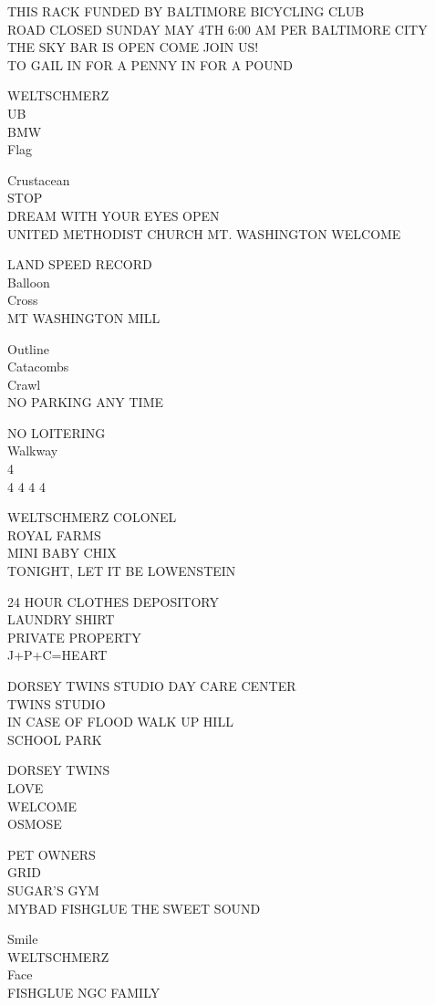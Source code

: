 \documentclass[10pt,letterpaper]{article}
\begin{document}
THIS RACK FUNDED BY BALTIMORE BICYCLING CLUB\\
ROAD CLOSED SUNDAY MAY 4TH 6:00 AM PER BALTIMORE CITY\\
THE SKY BAR IS OPEN COME JOIN US!\\
TO GAIL IN FOR A PENNY IN FOR A POUND

WELTSCHMERZ\\
UB\\
BMW\\
Flag

Crustacean\\
STOP\\
DREAM WITH YOUR EYES OPEN\\
UNITED METHODIST CHURCH MT. WASHINGTON WELCOME

LAND SPEED RECORD\\
Balloon\\
Cross\\
MT WASHINGTON MILL

Outline\\
Catacombs\\
Crawl\\
NO PARKING ANY TIME

NO LOITERING\\
Walkway\\
4\\
4 4 4 4

WELTSCHMERZ COLONEL\\
ROYAL FARMS\\
MINI BABY CHIX\\
TONIGHT, LET IT BE LOWENSTEIN

24 HOUR CLOTHES DEPOSITORY\\
LAUNDRY SHIRT\\
PRIVATE PROPERTY\\
J+P+C=HEART

DORSEY TWINS STUDIO DAY CARE CENTER\\
TWINS STUDIO\\
IN CASE OF FLOOD WALK UP HILL\\
SCHOOL PARK

DORSEY TWINS\\
LOVE\\
WELCOME\\
OSMOSE

PET OWNERS\\
GRID\\
SUGAR'S GYM\\
MYBAD FISHGLUE THE SWEET SOUND

Smile\\
WELTSCHMERZ\\
Face\\
FISHGLUE NGC FAMILY
\end{document}
